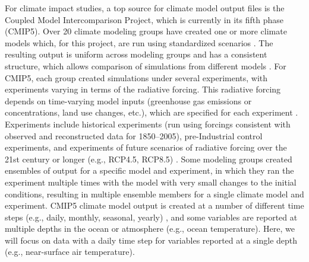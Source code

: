 For climate impact studies, a top source for climate model output files
is the Coupled Model Intercomparison Project, which is currently in its
fifth phase (CMIP5). Over 20 climate modeling groups have created one or
more climate models which, for this project, are run using standardized
scenarios \citep{taylor2012overview}. The resulting output is uniform
across modeling groups and has a consistent structure, which allows
comparison of simulations from different models \citep{IPCCch9}. For
CMIP5, each group created simulations under several experiments, with
experiments varying in terms of the radiative forcing. This radiative
forcing depends on time-varying model inputs (greenhouse gas emissions
or concentrations, land use changes, etc.), which are specified for each
experiment \citep{taylor2012overview, IPCCch9}. Experiments include
historical experiments (run using forcings consistent with observed and
reconstructed data for 1850--2005), pre-Industrial control experiments,
and experiments of future scenarios of radiative forcing over the 21st
century or longer (e.g., RCP4.5, RCP8.5) \citep{taylor2012overview}.
Some modeling groups created ensembles of output for a specific model
and experiment, in which they ran the experiment multiple times with the
model with very small changes to the initial conditions, resulting in
multiple ensemble members for a single climate model and experiment.
CMIP5 climate model output is created at a number of different time
steps (e.g., daily, monthly, seasonal, yearly) \citep{taylor2010cmip5},
and some variables are reported at multiple depths in the ocean or
atmosphere (e.g., ocean temperature). Here, we will focus on data with a
daily time step for variables reported at a single depth (e.g.,
near-surface air temperature).

